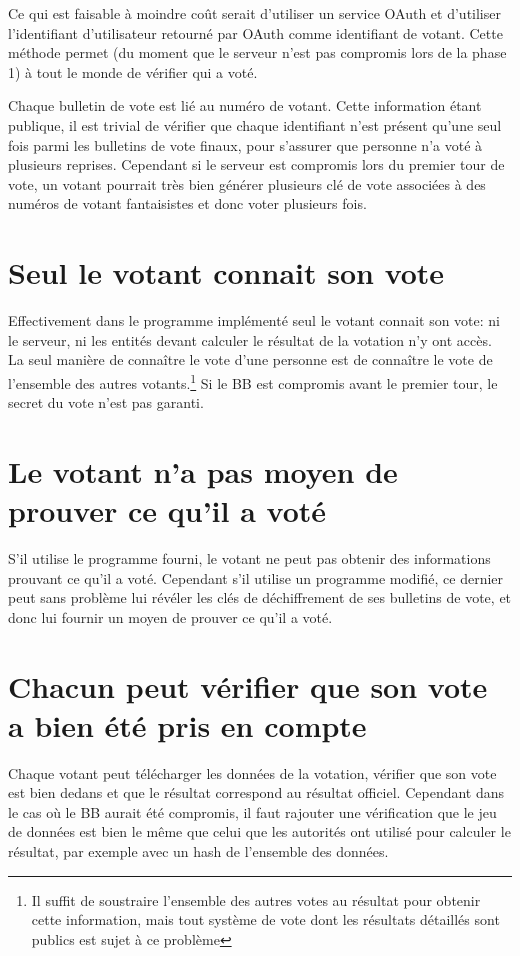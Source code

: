 \documentclass[../report]{subfiles}
\begin{document}
Ce qui est faisable à moindre coût serait d'utiliser un service OAuth et d'utiliser l'identifiant
d'utilisateur retourné par OAuth comme identifiant de votant.
Cette méthode permet (du moment que le serveur n'est pas compromis lors de la phase 1)
à tout le monde de vérifier qui a voté.

Chaque bulletin de vote est lié au numéro de votant. 
Cette information étant publique, il est trivial de vérifier que chaque identifiant n'est présent
qu'une seul fois parmi les bulletins de vote finaux, pour s'assurer que personne n'a voté à plusieurs reprises.
Cependant si le serveur est compromis lors du premier tour de vote, un votant pourrait très bien
générer plusieurs clé de vote associées à des numéros de votant fantaisistes et donc voter 
plusieurs fois.

\section{Seul le votant connait son vote}

Effectivement dans le programme implémenté seul le votant connait son vote: ni le serveur, 
ni les entités devant calculer le résultat de la votation n'y ont accès.
La seul manière de connaître le vote d'une personne est de connaître le vote de l'ensemble 
des autres votants.\footnote{Il suffit de soustraire l'ensemble des autres votes au résultat
pour obtenir cette information, mais tout système de vote dont les résultats détaillés sont publics est
sujet à ce problème}
Si le BB est compromis avant le premier tour, le secret du vote n'est pas garanti.

\section{Le votant n'a pas moyen de prouver ce qu'il a voté}

S'il utilise le programme fourni, le votant ne peut pas obtenir des informations prouvant ce qu'il a voté.
Cependant s'il utilise un programme modifié, ce dernier peut sans problème lui révéler les clés de déchiffrement
de ses bulletins de vote, et donc lui fournir un moyen de prouver ce qu'il a voté.

\section{Chacun peut vérifier que son vote a bien été pris en compte}

Chaque votant peut télécharger les données de la votation, vérifier que son vote est bien dedans et que le résultat 
correspond au résultat officiel.
Cependant dans le cas où le BB aurait été compromis, il faut rajouter une vérification que le jeu de données est bien le même que celui
que les autorités ont utilisé pour calculer le résultat, par exemple avec un hash de l'ensemble des données.
\end{document}
